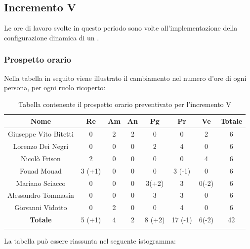 		
		\subsection{Incremento V }
		Le ore di lavoro svolte in questo periodo sono volte all'implementazione della configurazione dinamica di un .
		\subsubsection{Prospetto orario}
			Nella tabella in seguito viene illustrato il cambiamento nel numero d'ore di ogni persona, per ogni ruolo ricoperto:
			
			\begin{longtable}{|c|c|c|c|c|c|c|c}
				\hline
				\rowcolor{lighter-grayer}
				\textbf{Nome} & \textbf{Re} & \textbf{Am} & \textbf{An} & \textbf{Pg}  & \textbf{Pr}   & \textbf{Ve} & \textbf{Totale} \\
				\hline
				\endfirsthead
				\hline
				Giuseppe Vito Bitetti & 0 & 2 & 2 & 0 & 0 & 2 & 6\\
				\hline
				\hline
				Lorenzo Dei Negri & 0 & 0 & 0 & 2 & 4 & 0 & 6\\
				\hline
				\hline
				Nicolò Frison & 2 & 0 & 0 & 0 & 0 & 4 & 6\\
				\hline
				\hline
				Fouad Mouad & 3 (+1) & 0 & 0 & 0 & 3 (-1) & 0 & 6 \\
				\hline
				\hline
				Mariano Sciacco & 0 & 0 & 0 & 3(+2) & 3 & 0(-2) & 6\\
				\hline
				\hline
				Alessandro Tommasin & 0 & 0 & 0 & 3 & 3 & 0 & 6\\
				\hline
				\hline
				Giovanni Vidotto & 0 & 2 & 0 & 0 & 4 & 0 & 6\\
				\hline 
				\textbf{Totale} & 5 (+1) & 4 & 2 & 8 (+2) & 17 (-1) & 6(-2) & 42 \\
				\hline 
				
				\caption{Tabella contenente il prospetto orario preventivato per l'incremento V}
			\end{longtable}	
			
			La tabella può essere riassunta nel seguente istogramma:
			
